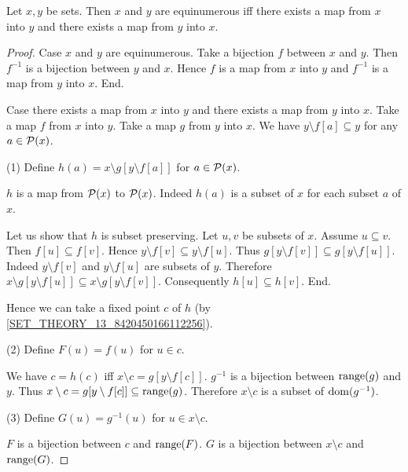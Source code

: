 \documentclass[../set-theory.tex]{subfiles}
\begin{document}
  \begin{forthel}
    \begin{theorem}\label{SET_THEORY_13_1913663275401216}
      Let $x, y$ be sets.
      Then $x$ and $y$ are equinumerous iff there exists a map from $x$ into $y$
      and there exists a map from $y$ into $x$.
    \end{theorem}
    \begin{proof}
      Case $x$ and $y$ are equinumerous.
        Take a bijection $f$ between $x$ and $y$.
        Then $f^{-1}$ is a bijection between $y$ and $x$.
        Hence $f$ is a map from $x$ into $y$ and $f^{-1}$ is a map from $y$ into
        $x$.
      End.

      Case there exists a map from $x$ into $y$ and there exists a map from $y$
      into $x$.
        Take a map $f$ from $x$ into $y$.
        Take a map $g$ from $y$ into $x$.
        We have $y \setminus f[a] \subseteq y$ for any $a \in \mathcal{P}(x)$.

        (1) Define $h(a) = x \setminus g[y \setminus f[a]]$ for $a \in \mathcal{P}(x)$.

        $h$ is a map from $\mathcal{P}(x)$ to $\mathcal{P}(x)$.
        Indeed $h(a)$ is a subset of $x$ for each subset $a$ of $x$.

        Let us show that $h$ is subset preserving.
          Let $u, v$ be subsets of $x$.
          Assume $u \subseteq v$.
          Then $f[u] \subseteq f[v]$.
          Hence $y \setminus f[v] \subseteq y \setminus f[u]$.
          Thus $g[y \setminus f[v]] \subseteq g[y \setminus f[u]]$.
          Indeed $y \setminus f[v]$ and $y \setminus f[u]$ are subsets of $y$.
          Therefore $x \setminus g[y \setminus f[u]] \subseteq
          x \setminus g[y \setminus f[v]]$.
          Consequently $h[u] \subseteq h[v]$.
        End.

        Hence we can take a fixed point $c$ of $h$ (by
        \ref{SET_THEORY_13_8420450166112256}).

        (2) Define $F(u) = f(u)$ for $u \in c$.

        We have $c = h(c)$ iff $x \setminus c = g[y \setminus f[c]]$.
        $g^{-1}$ is a bijection between $\operatorname{range}(g)$ and $y$.
        Thus $x \setminus c = g[y \setminus f[c]] \subseteq \operatorname{range}(g)$.
        Therefore $x \setminus c$ is a subset of $\operatorname{dom}(g^{-1})$.

        (3) Define $G(u) = g^{-1}(u)$ for $u \in x \setminus c$.

        $F$ is a bijection between $c$ and $\operatorname{range}(F)$.
        $G$ is a bijection between $x \setminus c$ and $\operatorname{range}(G)$.


\end{proof}
\end{forthel}
\end{document}

